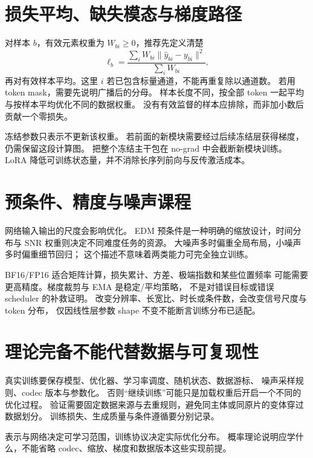\section{损失平均、缺失模态与梯度路径}

对样本 $b$，有效元素权重为 $W_{bi}\geq0$，推荐先定义清楚
\[
\ell_b=\frac{\sum_iW_{bi}\|\hat y_{bi}-y_{bi}\|^2}{\sum_iW_{bi}},
\]
再对有效样本平均。这里 $i$ 若已包含标量通道，不能再重复除以通道数。
若用 token mask，需要先说明广播后的分母。
样本长度不同，按全部 token 一起平均与按样本平均优化不同的数据权重。
没有有效监督的样本应排除，而非加小数后贡献一个零损失。

冻结参数只表示不更新该权重。
若前面的新模块需要经过后续冻结层获得梯度，仍需保留这段计算图。
把整个冻结主干包在 no-grad 中会截断新模块训练。
LoRA 降低可训练状态量，并不消除长序列前向与反传激活成本。

\section{预条件、精度与噪声课程}

网络输入输出的尺度会影响优化。
EDM 预条件是一种明确的缩放设计，时间分布与 SNR 权重则决定不同难度任务的资源。
大噪声多时偏重全局布局，小噪声多时偏重细节回归；
这个描述不意味着两类能力可完全独立训练。

BF16/FP16 适合矩阵计算，损失累计、方差、极端指数和某些位置频率
可能需要更高精度。梯度裁剪与 EMA 是稳定/平均策略，
不是对错误目标或错误 scheduler 的补救证明。
改变分辨率、长宽比、时长或条件数，会改变信号尺度与 token 分布，
仅因线性层参数 shape 不变不能断言训练分布已适配。

\section{理论完备不能代替数据与可复现性}

真实训练要保存模型、优化器、学习率调度、随机状态、数据游标、
噪声采样规则、codec 版本与参数化。
否则“继续训练”可能只是加载权重后开启一个不同的优化过程。
验证需要固定数据来源与去重规则，避免同主体或同原片的变体穿过数据划分。
训练损失、生成质量与条件遵循要分别记录。

\begin{theorytakeaway}
表示与网络决定可学习范围，训练协议决定实际优化分布。
概率理论说明应学什么，不能省略 codec、缩放、梯度和数据版本这些实现前提。
\end{theorytakeaway}
